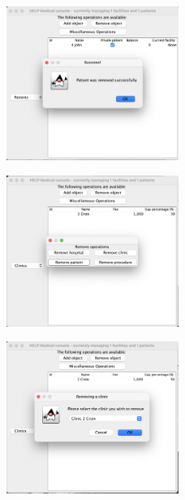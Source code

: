 \documentclass{article}
\begin{document}
\begin{figure}
  \begin{center}
  \includegraphics[width=0.5\textwidth]{./figures/Remove/Patient_3.png}
  \end{center}
\end{figure}

\begin{figure}
  \begin{center}
  \includegraphics[width=0.5\textwidth]{./figures/Remove/Clinic_1.png}
  \end{center}
\end{figure}

\begin{figure}
  \begin{center}
    \includegraphics[width=0.5\textwidth]{./figures/Remove/Clinic_2.png}
  \end{center}
\end{figure}
\end{document}
